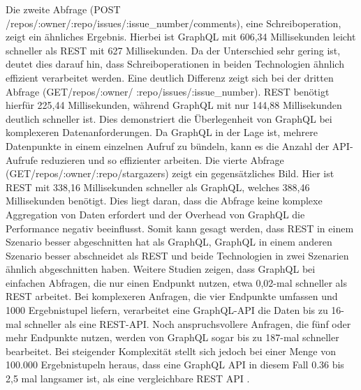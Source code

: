 Die zweite Abfrage (POST /repos/:owner/:repo/issues/:issue\_number/comments), eine Schreiboperation, zeigt ein ähnliches Ergebnis. Hierbei ist GraphQL mit 606,34 Millisekunden leicht schneller als REST mit 627 Millisekunden. Da der Unterschied sehr gering ist, deutet dies darauf hin, dass Schreiboperationen in beiden Technologien ähnlich effizient verarbeitet werden.
Eine deutlich Differenz zeigt sich bei der dritten Abfrage (GET/repos/:owner/ :repo/issues/:issue\_number). REST benötigt hierfür 225,44 Millisekunden, während GraphQL mit nur 144,88 Millisekunden deutlich schneller ist. Dies demonstriert die Überlegenheit von GraphQL bei komplexeren Datenanforderungen. Da GraphQL in der Lage ist, mehrere Datenpunkte in einem einzelnen Aufruf zu bündeln, kann es die Anzahl der API-Aufrufe reduzieren und so effizienter arbeiten.
Die vierte Abfrage (GET/repos/:owner/:repo/stargazers) zeigt ein gegensätzliches Bild. Hier ist REST mit 338,16 Millisekunden schneller als GraphQL, welches 388,46 Millisekunden benötigt. Dies liegt daran, dass die Abfrage keine komplexe Aggregation von Daten erfordert und der Overhead von GraphQL die Performance negativ beeinflusst.
Somit kann gesagt werden, dass REST in einem Szenario besser abgeschnitten hat als GraphQL, GraphQL in einem anderen Szenario besser abschneidet als REST und beide Technologien in zwei Szenarien ähnlich abgeschnitten haben.
\citep{graphqlreplacerest}
\newline
Weitere Studien zeigen, dass GraphQL bei einfachen Abfragen, die nur einen Endpunkt nutzen, etwa 0,02-mal schneller als REST arbeitet. \citep{migrategraphql}
\newline
Bei komplexeren Anfragen, die vier Endpunkte umfassen und 1000 Ergebnistupel liefern, verarbeitet eine GraphQL-API die Daten bis zu 16-mal schneller als eine REST-API.\citep{analysegraphql}
\newline
Noch anspruchsvollere Anfragen, die fünf oder mehr Endpunkte nutzen, werden von GraphQL sogar bis zu 187-mal schneller bearbeitet.\citep{analysewebgraphql}
\newline
Bei steigender Komplexität stellt sich jedoch bei einer Menge von 100.000 Ergebnistupeln heraus, dass eine GraphQL API in diesem Fall 0.36 \citep{analysegraphql} bis 2,5 mal langsamer ist, als eine vergleichbare REST API \citep{restvsgraphql}.
